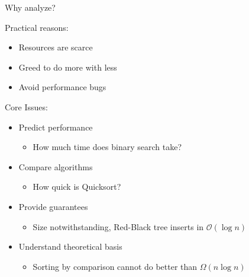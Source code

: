 \documentclass[aspectratio=169, xcolor=dvipsnames]{beamer}
\begin{document}
\begin{frame}{Why analyze?}
    \begin{block}{Practical reasons:}
        \begin{itemize}[<+->]
            \item Resources are scarce
            \item Greed to do more with less
            \item Avoid performance bugs
        \end{itemize}
    \end{block}
    \begin{alertblock}{Core Issues:}
        \begin{itemize}[<+->]
            \item Predict performance
            \begin{itemize}[<+->]
                \item How much time does binary search take?
            \end{itemize}
            \item Compare algorithms
            \begin{itemize}[<+->]
                \item How quick is Quicksort?
            \end{itemize}
            \item Provide guarantees
            \begin{itemize}[<+->]
                \item Size notwithstanding, Red-Black tree inserts in $\mathcal{O}(\log n)$
            \end{itemize}
            \item Understand theoretical basis
            \begin{itemize}[<+->]
                \item Sorting by comparison cannot do better than $\Omega(n \log n)$
            \end{itemize}
        \end{itemize}
    \end{alertblock}
\end{frame}
\end{document}
